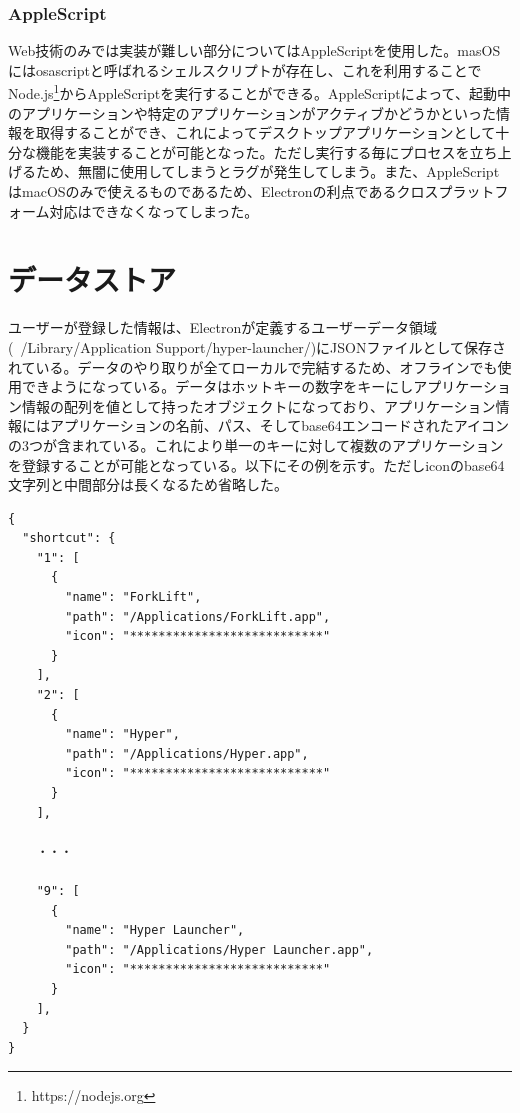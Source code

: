 \subsubsection{AppleScript}
Web技術のみでは実装が難しい部分についてはAppleScriptを使用した。masOSにはosascriptと呼ばれるシェルスクリプトが存在し、これを利用することでNode.js\footnote{https://nodejs.org}からAppleScriptを実行することができる。AppleScriptによって、起動中のアプリケーションや特定のアプリケーションがアクティブかどうかといった情報を取得することができ、これによってデスクトップアプリケーションとして十分な機能を実装することが可能となった。ただし実行する毎にプロセスを立ち上げるため、無闇に使用してしまうとラグが発生してしまう。また、AppleScriptはmacOSのみで使えるものであるため、Electronの利点であるクロスプラットフォーム対応はできなくなってしまった。

\section{データストア}
ユーザーが登録した情報は、Electronが定義するユーザーデータ領域(~/Library/Application Support/hyper-launcher/)にJSONファイルとして保存されている。データのやり取りが全てローカルで完結するため、オフラインでも使用できようになっている。データはホットキーの数字をキーにしアプリケーション情報の配列を値として持ったオブジェクトになっており、アプリケーション情報にはアプリケーションの名前、パス、そしてbase64エンコードされたアイコンの3つが含まれている。これにより単一のキーに対して複数のアプリケーションを登録することが可能となっている。以下にその例を示す。ただしiconのbase64文字列と中間部分は長くなるため省略した。

\begin{lstlisting}[caption=config.json]
{
  "shortcut": {
    "1": [
      {
        "name": "ForkLift",
        "path": "/Applications/ForkLift.app",
        "icon": "***************************"
      }
    ],
    "2": [
      {
        "name": "Hyper",
        "path": "/Applications/Hyper.app",
        "icon": "***************************"
      }
    ],
    
    ・・・
    
    "9": [
      {
        "name": "Hyper Launcher",
        "path": "/Applications/Hyper Launcher.app",
        "icon": "***************************"
      }
    ],
  }
}
\end{lstlisting}
